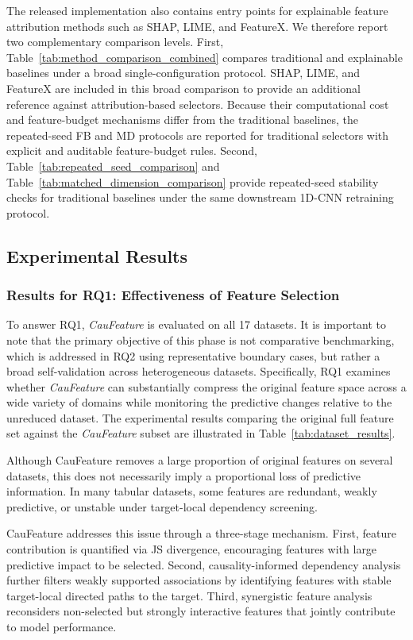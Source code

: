 \documentclass[journal]{IEEEtran}
\begin{document}
The released implementation also contains entry points for explainable feature attribution methods such as SHAP, LIME, and FeatureX. We therefore report two complementary comparison levels. First, Table~\ref{tab:method_comparison_combined} compares traditional and explainable baselines under a broad single-configuration protocol. SHAP, LIME, and FeatureX are included in this broad comparison to provide an additional reference against attribution-based selectors. Because their computational cost and feature-budget mechanisms differ from the traditional baselines, the repeated-seed FB and MD protocols are reported for traditional selectors with explicit and auditable feature-budget rules. Second, Table~\ref{tab:repeated_seed_comparison} and Table~\ref{tab:matched_dimension_comparison} provide repeated-seed stability checks for traditional baselines under the same downstream 1D-CNN retraining protocol.

\subsection{Experimental Results}
\subsubsection{Results for RQ1: Effectiveness of Feature Selection}
To answer RQ1, \textit{CauFeature} is evaluated on all 17 datasets. It is important to note that the primary objective of this phase is not comparative benchmarking, which is addressed in RQ2 using representative boundary cases, but rather a broad self-validation across heterogeneous datasets. Specifically, RQ1 examines whether \textit{CauFeature} can substantially compress the original feature space across a wide variety of domains while monitoring the predictive changes relative to the unreduced dataset. The experimental results comparing the original full feature set against the \textit{CauFeature} subset are illustrated in Table~\ref{tab:dataset_results}.

Although CauFeature removes a large proportion of original features on several datasets, this does not necessarily imply a proportional loss of predictive information. In many tabular datasets, some features are redundant, weakly predictive, or unstable under target-local dependency screening.

CauFeature addresses this issue through a three-stage mechanism. First, feature contribution is quantified via JS divergence, encouraging features with large predictive impact to be selected. Second, causality-informed dependency analysis further filters weakly supported associations by identifying features with stable target-local directed paths to the target. Third, synergistic feature analysis reconsiders non-selected but strongly interactive features that jointly contribute to model performance.
\end{document}
